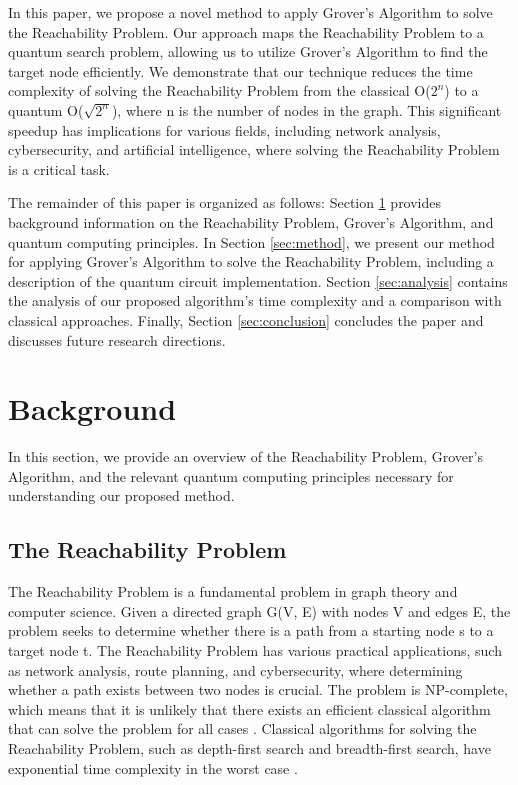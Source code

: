 In this paper, we propose a novel method to apply Grover's Algorithm to solve the Reachability Problem. Our approach maps the Reachability Problem to a quantum search problem, allowing us to utilize Grover's Algorithm to find the target node efficiently. We demonstrate that our technique reduces the time complexity of solving the Reachability Problem from the classical O($2^n$) to a quantum O($\sqrt{2^n}$), where n is the number of nodes in the graph. This significant speedup has implications for various fields, including network analysis, cybersecurity, and artificial intelligence, where solving the Reachability Problem is a critical task.

The remainder of this paper is organized as follows: Section \ref{sec:background} provides background information on the Reachability Problem, Grover's Algorithm, and quantum computing principles. In Section \ref{sec:method}, we present our method for applying Grover's Algorithm to solve the Reachability Problem, including a description of the quantum circuit implementation. Section \ref{sec:analysis} contains the analysis of our proposed algorithm's time complexity and a comparison with classical approaches. Finally, Section \ref{sec:conclusion} concludes the paper and discusses future research directions.

\section{Background}
\label{sec:background}

In this section, we provide an overview of the Reachability Problem, Grover's Algorithm, and the relevant quantum computing principles necessary for understanding our proposed method.

\subsection{The Reachability Problem}

The Reachability Problem is a fundamental problem in graph theory and computer science. Given a directed graph G(V, E) with nodes V and edges E, the problem seeks to determine whether there is a path from a starting node s to a target node t. The Reachability Problem has various practical applications, such as network analysis, route planning, and cybersecurity, where determining whether a path exists between two nodes is crucial. The problem is NP-complete, which means that it is unlikely that there exists an efficient classical algorithm that can solve the problem for all cases \cite{cook1971complexity}. Classical algorithms for solving the Reachability Problem, such as depth-first search and breadth-first search, have exponential time complexity in the worst case \cite{cormen2009introduction}.

